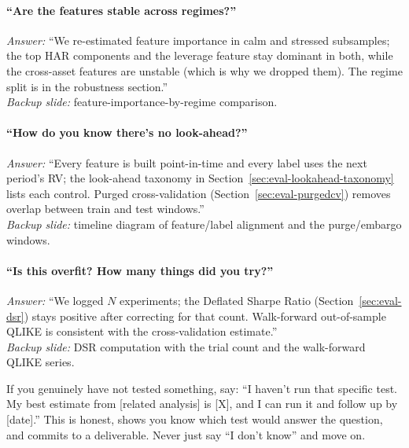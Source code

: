\paragraph{``Are the features stable across regimes?''}
\emph{Answer:} ``We re-estimated feature importance in calm and stressed subsamples; the top HAR components and the leverage feature stay dominant in both, while the cross-asset features are unstable (which is why we dropped them). The regime split is in the robustness section.''\\
\noindent\emph{Backup slide:} feature-importance-by-regime comparison.

\paragraph{``How do you know there's no look-ahead?''}
\emph{Answer:} ``Every feature is built point-in-time and every label uses the next period's RV; the look-ahead taxonomy in Section~\ref{sec:eval-lookahead-taxonomy} lists each control. Purged cross-validation (Section~\ref{sec:eval-purgedcv}) removes overlap between train and test windows.''\\
\noindent\emph{Backup slide:} timeline diagram of feature/label alignment and the purge/embargo windows.

\paragraph{``Is this overfit? How many things did you try?''}
\emph{Answer:} ``We logged $N$ experiments; the Deflated Sharpe Ratio (Section~\ref{sec:eval-dsr}) stays positive after correcting for that count. Walk-forward out-of-sample QLIKE is consistent with the cross-validation estimate.''\\
\noindent\emph{Backup slide:} DSR computation with the trial count and the walk-forward QLIKE series.

\begin{warning}
If you genuinely have not tested something, say: ``I haven't run that specific test. My best estimate from [related analysis] is [X], and I can run it and follow up by [date].'' This is honest, shows you know which test would answer the question, and commits to a deliverable. Never just say ``I don't know'' and move on.
\end{warning}

